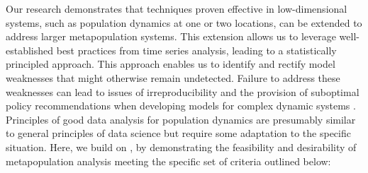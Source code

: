 \documentclass[12pt]{article}\usepackage[]{graphicx}\usepackage[]{xcolor}
\begin{document}
Our research demonstrates that techniques proven effective in low-dimensional systems, such as population dynamics at one or two locations, can be extended to address larger metapopulation systems. This extension allows us to leverage well-established best practices from time series analysis, leading to a statistically principled approach. This approach enables us to identify and rectify model weaknesses that might otherwise remain undetected. Failure to address these weaknesses can lead to issues of irreproducibility and the provision of suboptimal policy recommendations when developing models for complex dynamic systems \cite{saltelli20,ioannidis22}.
Principles of good data analysis for population dynamics are presumably similar to general principles of data science \cite{yu20} but require some adaptation to the specific situation.
Here, we build on \cite{saltelli20,ioannidis22,yu20}, by demonstrating the feasibility and desirability of metapopulation analysis meeting the specific set of criteria outlined below:
\end{document}
